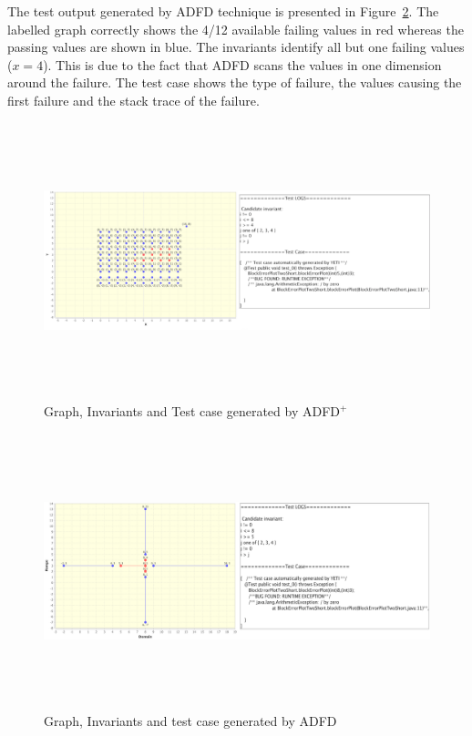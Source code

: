 The test output generated by ADFD technique is presented in Figure~\ref{fig:ADFD}. The labelled graph correctly shows the 4/12 available failing values in red whereas the passing values are shown in blue. The invariants identify all but one failing values ($x = 4$). This is due to the fact that ADFD scans the values in one dimension around the failure. The test case shows the type of failure, the values causing the first failure and the stack trace of the failure. 


\bigskip
\begin{figure}[H]
\centering
\includegraphics[width= 15.5cm,height=8cm]{chapter7/adfdPlusCombined.png}
\caption{Graph, Invariants and Test case generated by ADFD$^+$}
\label{fig:ADFD+}
\end{figure}
\bigskip



\begin{figure}[H]
\centering
\includegraphics[width= 15.5cm,height=8cm]{chapter7/adfdCombined.png}
\caption{Graph, Invariants and test case generated by ADFD}
\label{fig:ADFD}
\end{figure}

